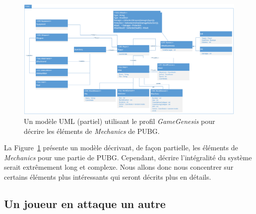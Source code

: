 \begin{landscape}
\begin{figure}
    \centering
    \includegraphics[width=\linewidth]{10_img/chap6/final_model.PNG}
    \caption{Un modèle UML (partiel) utilisant le profil \emph{GameGenesis} pour d\'ecrire les \'el\'ements de \emph{Mechanics} de PUBG.}
    \label{fig.PUBG_model}
\end{figure}
\end{landscape}



La Figure~\ref{fig.PUBG_model} présente un mod\`ele d\'ecrivant, de
fa\c{c}on partielle, les \'el\'ements de \emph{Mechanics} pour une
partie de PUBG.
%
Cependant, décrire l'intégralité du système serait extrêmement long et complexe. Nous allons donc nous concentrer sur certains \'el\'ements plus int\'eressants qui seront décrits plus en détails.







\subsection{Un joueur en attaque un autre}
\label{sect.attack}

